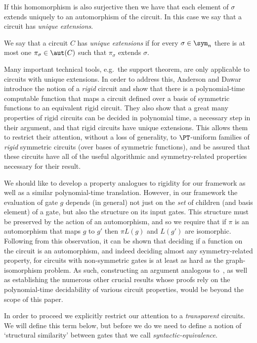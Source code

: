 \documentclass[a4paper,UKenglish]{lipics-v2018}
\begin{document}
If this homomorphism is also surjective then we have that each element of
$\sigma$ extends uniquely to an automorphism of the circuit. In this case we say
that a circuit has \emph{unique extensions}.

\begin{definition}
  We say that a circuit $C$ has \emph{unique extensions} if for every $\sigma
  \in \sym_n$ there is at most one $\pi_{\sigma} \in \aut(C)$ such that
  $\pi_{\sigma}$ extends $\sigma$.
\end{definition}

Many important technical tools, e.g.\ the support theorem, are only applicable
to circuits with unique extensions. In order to address this, Anderson and
Dawar~\cite{AndersonD17} introduce the notion of a \emph{rigid} circuit and show
that there is a polynomial-time computable function that maps a circuit defined
over a basis of symmetric functions to an equivalent rigid circuit. They also
show that a great many properties of rigid circuits can be decided in polynomial
time, a necessary step in their argument, and that rigid circuits have unique
extensions. This allows them to restrict their attention, without a loss of
generality, to $\PT$-uniform families of \emph{rigid} symmetric circuits (over
bases of symmetric functions), and be assured that these circuits have all of
the useful algorithmic and symmetry-related properties necessary for their
result.

We should like to develop a property analogues to rigidity for our framework as
well as a similar polynomial-time translation. However, in our framework the
evaluation of gate $g$ depends (in general) not just on the \emph{set} of
children (and basis element) of a gate, but also the structure on its input
gates. This structure must be preserved by the action of an automorphism, and so
we require that if $\pi$ is an automorphism that maps $g$ to $g'$ then $\pi
L(g)$ and $L(g')$ are isomorphic. Following from this observation, it can be
shown that deciding if a function on the circuit is an automorphism, and indeed
deciding almost any symmetry-related property, for circuits with non-symmetric
gates is at least as hard as the graph-isomorphism problem. As such,
constructing an argument analogous to~\cite{AndersonD17}, as well as
establishing the numerous other crucial results whose proofs rely on the
polynomial-time decidability of various circuit properties, would be beyond the
scope of this paper.

In order to proceed we explicitly restrict our attention to a \emph{transparent}
circuits. We will define this term below, but before we do we need to define a
notion of `structural similarity' between gates that we call
\emph{syntactic-equivalence}.
\end{document}
